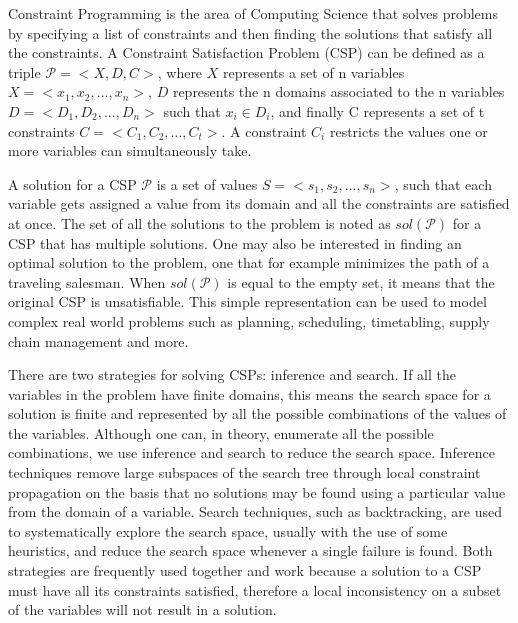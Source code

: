 \documentclass{l4proj}
\begin{document}
\noindent Constraint Programming is the area of Computing Science that solves problems by specifying a list of constraints and then finding the solutions that satisfy all the constraints.
A Constraint Satisfaction Problem (CSP) can be defined as a triple $\mathcal{P} = <X, D, C>$, where $X$ represents a set of n variables $X = <x_1, x_2,..., x_n>$, $D$ represents the n domains associated to the n variables $D = <D_1, D_2,..., D_n>$ such that $x_i \in D_i$, and finally C represents a set of t constraints $C = <C_1, C_2,..., C_t>$. A constraint $C_i$ restricts the values one or more variables can simultaneously take.

\noindent A solution for a CSP $\mathcal{P}$ is a set of values $S = <s_1, s_2,..., s_n>$, such that each variable gets assigned a value from its domain and all the constraints are satisfied at once. The set of all the solutions to the problem is noted as $sol(\mathcal{P})$ for a CSP that has multiple solutions. One may also be interested in finding an optimal solution to the problem, one that for example minimizes the path of a traveling salesman. When $sol(\mathcal{P})$ is equal to the empty set, it means that the original CSP is unsatisfiable. This simple representation can be used to model complex real world problems such as planning, scheduling, timetabling, supply chain management and more.

\noindent There are two strategies for solving CSPs: inference and search. If all the variables in the problem have finite domains, this means the search space for a solution is finite and represented by all the possible combinations of the values of the variables. Although one can, in theory, enumerate all the possible combinations, we use inference and search to reduce the search space. Inference techniques remove large subspaces of the search tree through local constraint propagation on the basis that no solutions may be found using a particular value from the domain of a variable. Search techniques, such as backtracking, are used to systematically explore the search space, usually with the use of some heuristics, and reduce the search space whenever a single failure is found. Both strategies are frequently used together and work because a solution to a CSP must have all its constraints satisfied, therefore a local inconsistency on a subset of the variables will not result in a solution.
\end{document}
